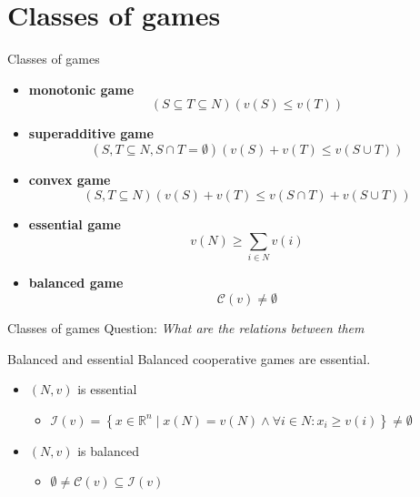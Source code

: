 \documentclass{beamer}
\newcommand{\R}{\mathbb{R}}
\begin{document}


\section{Classes of games}


\begin{frame}{Classes of games}
    \begin{itemize}
		\item \textbf{monotonic game} \[\left(S \subseteq T \subseteq N\right)\left(v(S) \leq v(T)\right)\]
		\item \textbf{superadditive game} \[\left(S,T \subseteq N, S \cap T = \emptyset\right)\left(v(S)+v(T) \leq v\left(S \cup T\right)\right)\]
		\item \textbf{convex game} \[\left(S,T \subseteq N\right)\left(v(S)+v(T) \leq v\left(S \cap T\right)+v\left(S \cup T\right)\right)\]
		\item \textbf{essential game} \[v(N) \geq \sum_{i \in N} v(i)\]
		\item \textbf{balanced game} \[\mathcal{C}(v) \neq \emptyset\]
	\end{itemize}
\end{frame}



\begin{frame}{Classes of games}
    Question: \textit{What are the relations between them}
	\begin{block}{Balanced and essential}
		Balanced cooperative games are essential.
	\end{block}
	\begin{itemize}
		\item $(N,v)$ is essential
		\begin{itemize}
			\item $\mathcal{I}(v)=\left\{x \in \R^n \mid x(N)=v(N)\land \forall i \in N: x_i \geq v(i)\right\} \neq \emptyset$
		\end{itemize}
		\item $(N,v)$ is balanced
		\begin{itemize}
			\item $\emptyset \neq \mathcal{C}(v) \subseteq \mathcal{I}(v)$
		\end{itemize}
	\end{itemize}
\end{frame}
\end{document}
